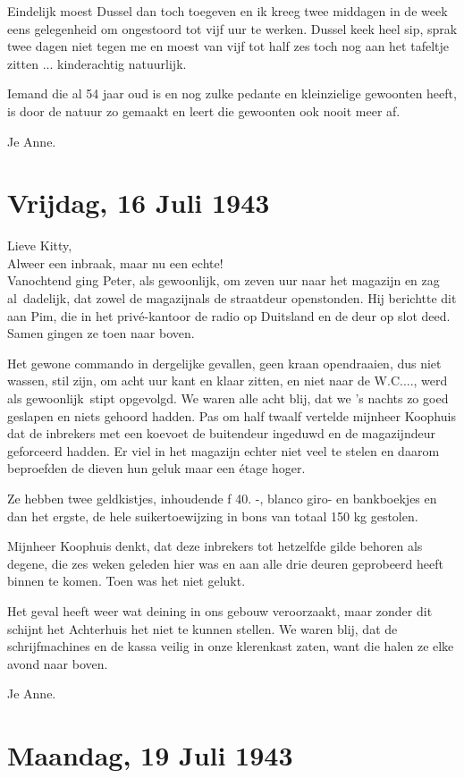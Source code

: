 \documentclass{book}
\begin{document}
Eindelijk moest Dussel dan toch toegeven en ik kreeg twee middagen in de
week eens gelegenheid om ongestoord tot vijf uur te werken. Dussel keek
heel sip, sprak twee dagen niet tegen me en moest van vijf tot half zes
toch nog aan het tafeltje zitten ... kinderachtig natuurlijk.

Iemand die al 54 jaar oud is en nog zulke pedante en kleinzielige
gewoonten heeft, is door de natuur zo gemaakt en leert die gewoonten ook
nooit meer af.

Je Anne.

\chapter{Vrijdag, 16 Juli 1943}

Lieve Kitty,\\Alweer een inbraak, maar nu een echte!\\Vanochtend ging
Peter, als gewoonlijk, om zeven uur naar het magazijn en zag
al~dadelijk, dat zowel de magazijnals de straatdeur openstonden. Hij
berichtte dit aan Pim, die in het privé-kantoor de radio op Duitsland en
de deur op slot deed. Samen gingen ze toen naar boven.

Het gewone commando in dergelijke gevallen, geen kraan opendraaien, dus
niet wassen, stil zijn, om acht uur kant en klaar zitten, en niet naar
de W.C...., werd als gewoonlijk~stipt opgevolgd. We waren alle acht
blij, dat we 's nachts zo goed geslapen en niets gehoord hadden. Pas om
half twaalf vertelde mijnheer Koophuis dat de inbrekers met een koevoet
de buitendeur ingeduwd en de magazijndeur geforceerd hadden. Er viel in
het magazijn echter niet veel te stelen en daarom beproefden de dieven
hun geluk maar een étage hoger.

Ze hebben twee geldkistjes, inhoudende ƒ 40. -, blanco giro- en
bankboekjes en dan het ergste, de hele suikertoewijzing in bons van
totaal 150 kg gestolen.

Mijnheer Koophuis denkt, dat deze inbrekers tot hetzelfde gilde behoren
als degene, die zes weken geleden hier was en aan alle drie deuren
geprobeerd heeft binnen te komen. Toen was het niet gelukt.

Het geval heeft weer wat deining in ons gebouw veroorzaakt, maar zonder
dit schijnt het Achterhuis het niet te kunnen stellen. We waren blij,
dat de schrijfmachines en de kassa veilig in onze klerenkast zaten, want
die halen ze elke avond naar boven.

Je Anne.

\chapter{Maandag, 19 Juli 1943}
\end{document}
